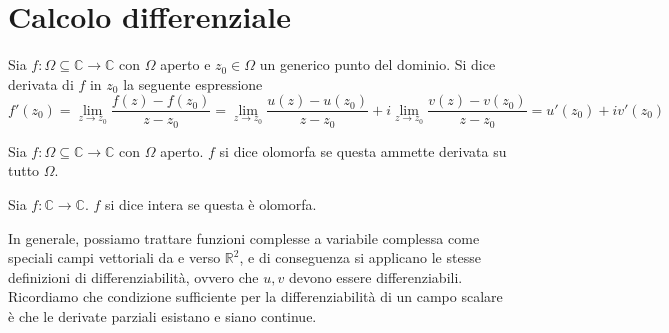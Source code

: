 \section{Calcolo differenziale}
        \begin{definition}
            Sia $f: \Omega \subseteq \mathbb{C} \rightarrow \mathbb{C}$ con $\Omega$ aperto e $z_{0} \in \Omega$ un generico punto del dominio.
            Si dice derivata di $f$ in $z_{0}$ la seguente espressione
            \[
                f'(z_{0}) = \lim_{z \rightarrow z_{0}} \frac{f(z) - f(z_{0})}{z - z_{0}} = \lim_{z \rightarrow z_{0}} \frac{u(z) - u(z_{0})}{z - z_{0}} + i \lim_{z \rightarrow z_{0}} \frac{v(z) - v(z_{0})}{z - z_{0}} = u'(z_{0}) + i v'(z_{0})
            \]
        \end{definition}

        \begin{definition}
            Sia $f: \Omega \subseteq \mathbb{C} \rightarrow \mathbb{C}$ con $\Omega$ aperto.
            $f$ si dice olomorfa se questa ammette derivata su tutto $\Omega$.
        \end{definition}

        \begin{definition}
            Sia $f: \mathbb{C} \rightarrow \mathbb{C}$.
            $f$ si dice intera se questa è olomorfa.
        \end{definition}

        In generale, possiamo trattare funzioni complesse a variabile complessa come speciali campi vettoriali da e verso $\mathbb{R}^{2}$, e di conseguenza si applicano le stesse definizioni di differenziabilità, ovvero che $u, v$ devono essere differenziabili.
        Ricordiamo che condizione sufficiente per la differenziabilità di un campo scalare è che le derivate parziali esistano e siano continue.

